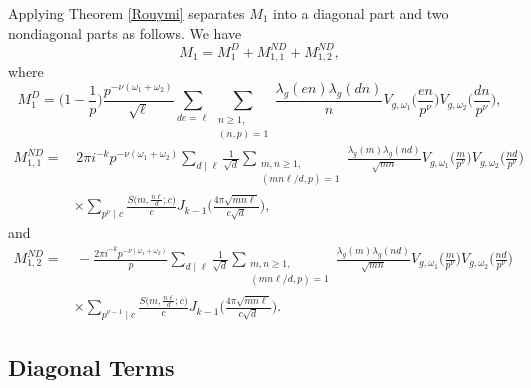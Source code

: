 \documentclass[12pt]{amsart}
\theoremstyle{plain}
\theoremstyle{definition}
\begin{document}
Applying Theorem \ref{Rouymi} separates $M_1$ into a diagonal part and two nondiagonal parts as follows. We have    \[
    M_1
    =
    M_1^{D}+
    M^{ND}_{1,1}+
    M^{ND}_{1,2},
    \]
where
    \[
    M^D_{1} 
    = \Big(1-\frac{1}{p}\Big) \frac{p^{-\nu(\omega_1+\omega_2)} }{\sqrt\ell} 
     \sum_{de= \ell } 
     \sum_{\substack{n\geq 1,\\ (n, p)=1}}
    \frac{\lambda_g (en) \lambda_g(dn)}{n}
    V_{g, \omega_1}\Big(\frac{en}{ p^\nu }\Big)
    V_{g, \omega_2}\Big(\frac{dn}{p^\nu }\Big),
    \]
      \begin{align*}
    M^{ND}_{1,1} 
    =&  \, 2\pi i^{-k} 
    p^{-\nu(\omega_1+\omega_2)} 
     \sum_{d\mid \ell}
     \frac{1}{\sqrt d}
     \sum_{\substack{m, n \geq 1,\\ (mn\ell/d, p)=1}}
    \frac{\lambda_g(m) \lambda_g(n d)}{\sqrt{mn}}
    V_{g, \omega_1}\Big(\frac{m}{p^\nu }\Big) 
    V_{g, \omega_2}\Big(\frac{nd}{p^\nu }\Big)
    \\
    &\times \sum_{p^\nu \mid c} 
    \frac{S\big(m, \frac{n\ell}{d}; c\big)}{c}
    J_{k-1}\Big(\frac{4\pi\sqrt{mn\ell}}{c\sqrt d}\Big),
    \end{align*}
and
    \begin{align*}
    M^{ND}_{1,2} 
    =&\, -\frac{2\pi i^{-k} 
    p^{-\nu(\omega_1+\omega_2)} }{p}  
     \sum_{d\mid \ell} 
     \frac{1}{\sqrt d}
     \sum_{\substack{m, n \geq 1,\\ (mn\ell/d, p)=1}}
    \frac{\lambda_g(m) \lambda_g(n d)}{\sqrt{mn}} 
    V_{g, \omega_1}\Big(\frac{m}{p^\nu }\Big) 
    V_{g, \omega_2}\Big(\frac{nd}{p^\nu }\Big)
    \\
    &\times \sum_{p^{\nu-1} \mid c} 
    \frac{S\big(m, \frac{n\ell}{d}; c\big)}{c}
    J_{k-1}\Big(\frac{4\pi\sqrt{mn\ell}}{c\sqrt d}\Big).
    \end{align*}


\subsection{Diagonal Terms} 
\end{document}

